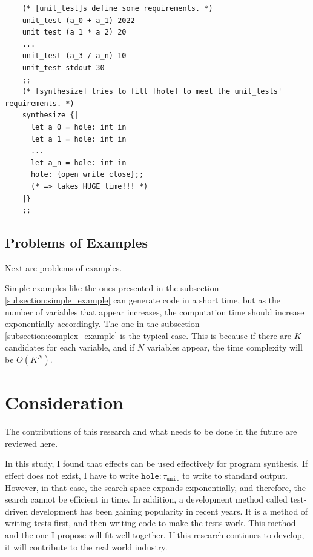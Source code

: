 \documentclass[12pt, a4paper, titlepage]{report}
\begin{document}
  \begin{verbatim}
    (* [unit_test]s define some requirements. *)
    unit_test (a_0 + a_1) 2022
    unit_test (a_1 * a_2) 20
    ...
    unit_test (a_3 / a_n) 10
    unit_test stdout 30
    ;;
    (* [synthesize] tries to fill [hole] to meet the unit_tests' requirements. *)
    synthesize {|
      let a_0 = hole: int in
      let a_1 = hole: int in
      ...
      let a_n = hole: int in
      hole: {open write close};;
      (* => takes HUGE time!!! *)
    |}
    ;;
  \end{verbatim}

  \subsection{Problems of Examples}
  Next are problems of examples.

  Simple examples like the ones presented in the subsection \ref{subsection:simple_example} can generate code in a short time, but as the number of variables that appear increases, the computation time should increase exponentially accordingly.
  The one in the subsection \ref{subsection:complex_example} is the typical case.
  This is because if there are $K$ candidates for each variable, and if $N$ variables appear, the time complexity will be $O(K^N)$.

  \section{Consideration}
  The contributions of this research and what needs to be done in the future are reviewed here.

  In this study, I found that effects can be used effectively for program synthesis.
  If effect does not exist, I have to write $\mathtt{hole : \tau_{unit}}$ to write to standard output.
  However, in that case, the search space expands exponentially, and therefore, the search cannot be efficient in time.
  In addition, a development method called test-driven development has been gaining popularity in recent years.
  It is a method of writing tests first, and then writing code to make the tests work.
  This method and the one I propose will fit well together.
  If this research continues to develop, it will contribute to the real world industry.
\end{document}
